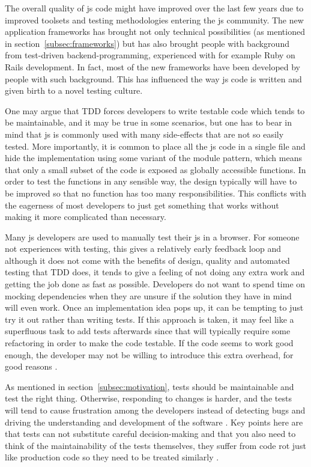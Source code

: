 \documentclass[11pt]{article}
\begin{document}
The overall quality of \gls{js} code might have improved over the last few years due to improved toolsets and testing methodologies entering the \gls{js} community. The new application frameworks has brought not only technical possibilities (as mentioned in section~\ref{subsec:frameworks}) but has also brought people with background from test-driven backend-programming, experienced with for example Ruby on Rails development. In fact, most of the new frameworks have been developed by people with such background. This has influenced the way \gls{js} code is written and given birth to a novel testing culture. \cite[questions~12-15]{Ahnve}

One may argue that TDD forces developers to write testable code which tends to be maintainable, and it may be true in some scenarios, but one has to bear in mind that \gls{js} is commonly used with many side-effects that are not so easily tested. More importantly, it is common to place all the \gls{js} code in a single file and hide the implementation using some variant of the module pattern\cite[p.~40]{GoodParts}, which means that only a small subset of the code is exposed as globally accessible functions. In order to test the functions in any sensible way, the design typically will have to be improved so that no function has too many responsibilities. This conflicts with the eagerness of most developers to just get something that works without making it more complicated than necessary.

Many \gls{js} developers are used to manually test their \gls{js} in a browser. For someone not experiences with testing, this gives a relatively early feedback loop and although it does not come with the benefits of design, quality and automated testing that TDD does, it tends to give a feeling of not doing any extra work and getting the job done as fast as possible. Developers do not want to spend time on mocking dependencies when they are unsure if the solution they have in mind will even work. Once an implementation idea pops up, it can be tempting to just try it out rather than writing tests. If this approach is taken, it may feel like a superfluous task to add tests afterwards since that will typically require some refactoring in order to make the code testable. If the code seems to work good enough, the developer may not be willing to introduce this extra overhead, for good reasons \cite[question~43]{Stenmark}.

As mentioned in section~\ref{subsec:motivation}, tests should be maintainable and test the right thing. Otherwise, responding to changes is harder, and the tests will tend to cause frustration among the developers instead of detecting bugs and driving the understanding and development of the software \cite{Clean}. Key points here are that tests can not substitute careful decision-making and that you also need to think of the maintainability of the tests themselves, they suffer from code rot just like production code so they need to be treated similarly \cite[question~36]{Ahnve}\cite[p.~123-133]{Clean}.
\end{document}
